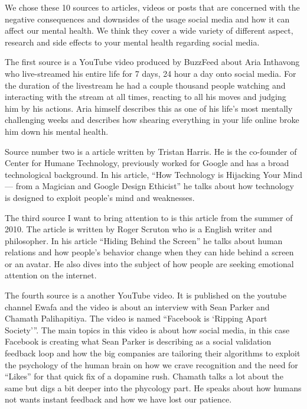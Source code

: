 \documentclass[11pt]{article}
\begin{document}
We chose these 10 sources to articles, videos or posts that are concerned with the
negative consequences and downsides of the usage social media and how it can affect
our mental health. We think they cover a wide variety of different aspect, research
and side effects to your mental health regarding social media.

The first source \cite{youtube1} is a YouTube video produced by BuzzFeed about Aria
Inthavong who live-streamed his entire life for 7 days, 24 hour a day onto social media.
For the duration of the livestream he had a couple thousand people watching and interacting
with the stream at all times, reacting to all his moves and judging him by his actions.
Aria himself describes this as one of his life's most mentally challenging weeks and
describes how shearing everything in your life online broke him down his mental health.

Source number two \cite{medium} is a article written by Tristan Harris. He is the
co-founder of Center for Humane Technology, previously worked for Google and has a
broad technological background. In his article, “How Technology is Hijacking Your Mind
— from a Magician and Google Design Ethicist” he talks about how technology is designed
to exploit people's mind and weaknesses.

The third source \cite{thenewatlantis} I want to bring attention to is this article
from the summer of 2010. The article is written by Roger Scruton who is a English
writer and philosopher. In his article “Hiding Behind the Screen” he talks about
human relations and how people's behavior change when they can hide behind a screen
or an avatar. He also dives into the subject of how people are seeking emotional
attention on the internet.

The fourth source \cite{youtube2} is a another YouTube video. It is published on
the youtube channel Ewafa and the video is about an interview with Sean Parker and
Chamath Palihapitiya. The video is named “Facebook is ‘Ripping Apart Society’”. The
main topics in this video is about how social media, in this case Facebook is creating
what Sean Parker is describing as a social validation feedback loop and how the big
companies are tailoring their algorithms to exploit the psychology of the human brain
on how we crave recognition and the need for “Likes” for that quick fix of a dopamine
rush. Chamath talks a lot about the same but digs a bit deeper into the phycology part.
He speaks about how humans not wants instant feedback and how we have lost our patience.
\end{document}
